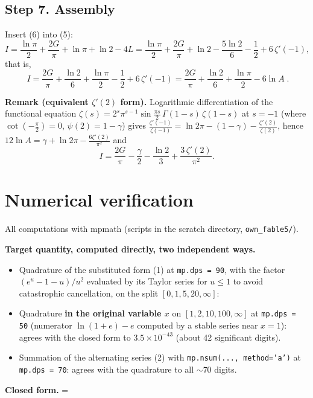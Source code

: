 \documentclass[11pt]{article}
\theoremstyle{remark}
\begin{document}
\subsection*{Step 7. Assembly}

Insert (6) into (5):
$$
I=\frac{\ln\pi}{2}+\frac{2G}{\pi}+\ln\pi+\ln 2-4L
=\frac{\ln\pi}{2}+\frac{2G}{\pi}+\ln 2-\frac{5\ln 2}{6}-\frac12+6\,\zeta'(-1),
$$
that is,
$$
\boxed{\;I=\frac{2G}{\pi}+\frac{\ln 2}{6}+\frac{\ln\pi}{2}-\frac12+6\,\zeta'(-1)
=\frac{2G}{\pi}+\frac{\ln 2}{6}+\frac{\ln\pi}{2}-6\ln A\; }.
$$

\textbf{Remark (equivalent $\zeta'(2)$ form).} Logarithmic differentiation of the functional equation
$\zeta(s)=2^{s}\pi^{s-1}\sin\frac{\pi s}{2}\,\Gamma(1-s)\,\zeta(1-s)$ at $s=-1$ (where $\cot(-\frac\pi2)=0$, $\psi(2)=1-\gamma$) gives
$\frac{\zeta'(-1)}{\zeta(-1)}=\ln 2\pi-(1-\gamma)-\frac{\zeta'(2)}{\zeta(2)}$, hence
$12\ln A=\gamma+\ln 2\pi-\frac{6\zeta'(2)}{\pi^{2}}$ and
$$
I=\frac{2G}{\pi}-\frac{\gamma}{2}-\frac{\ln 2}{3}+\frac{3\,\zeta'(2)}{\pi^{2}} .
$$

\section*{Numerical verification}

All computations with mpmath (scripts in the scratch directory, \texttt{own\_fable5/}).

\textbf{Target quantity, computed directly, two independent ways.}

\begin{itemize}
\item Quadrature of the substituted form (1) at \texttt{mp.dps = 90}, with the factor $(e^u-1-u)/u^2$ evaluated by its Taylor series for $u\le1$ to avoid catastrophic cancellation, on the split $[0,1,5,20,\infty]$:
  \texttt{}
\item Quadrature \textbf{in the original variable $x$} on $[1,2,10,100,\infty]$ at \texttt{mp.dps = 50} (numerator $\ln(1+e)-e$ computed by a stable series near $x=1$): agrees with the closed form to $3.5\times10^{-43}$ (about 42 significant digits).
\item Summation of the alternating series (2) with \texttt{mp.nsum(..., method='a')} at \texttt{mp.dps = 70}: agrees with the quadrature to all $\sim$70 digits.
\end{itemize}

\textbf{Closed form.}
\texttt{}
= \texttt{}
\end{document}
